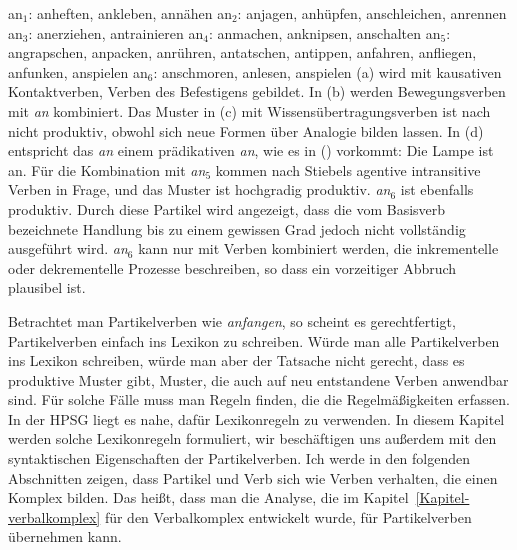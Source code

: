 \eal
\label{verschiedene-ans}
\ex an$_1$: anheften, ankleben, annähen                           
\ex an$_2$: anjagen,  anhüpfen, anschleichen, anrennen            
\ex an$_3$: anerziehen, antrainieren                              
\ex an$_4$: anmachen, anknipsen, anschalten                       
\ex an$_5$: angrapschen, anpacken, anrühren, antatschen, antippen,
            anfahren, anfliegen, anfunken, anspielen              
\ex an$_6$: anschmoren, anlesen, anspielen                        
\zl
(a) wird mit kausativen Kontaktverben, Verben des Befestigens gebildet. In
(b)
werden Bewegungsverben mit \emph{an} kombiniert. Das Muster in (c) mit Wissensübertragungsverben
ist nach \citet[]{Stiebels96a} nicht produktiv, obwohl sich neue Formen über Analogie bilden lassen.
In (d) entspricht das \emph{an} einem prädikativen \emph{an}, wie es in () vorkommt:
\ea
Die Lampe ist an.
\z
Für die Kombination mit \emph{an$_5$} kommen nach Stiebels agentive intransitive Verben in Frage,
und das Muster ist hochgradig produktiv.
\emph{an$_6$} ist ebenfalls produktiv. Durch diese Partikel wird angezeigt, dass die vom Basisverb
bezeichnete Handlung bis zu einem gewissen Grad jedoch nicht vollständig ausgeführt
wird. \emph{an$_6$} kann nur mit Verben kombiniert werden, die inkrementelle oder dekrementelle
Prozesse beschreiben, so dass ein vorzeitiger Abbruch plausibel ist.


Betrachtet man Partikelverben wie \emph{anfangen}, so scheint es gerechtfertigt, Partikelverben einfach
ins Lexikon zu schreiben. Würde man alle Partikelverben ins Lexikon schreiben, würde man aber der Tatsache
nicht gerecht, dass es produktive Muster gibt, \dash Muster, die auch auf neu entstandene Verben anwendbar
sind. Für solche Fälle muss man Regeln finden, die die Regelmäßigkeiten erfassen. In der HPSG liegt
es nahe, dafür Lexikonregeln zu verwenden. In diesem Kapitel werden solche Lexikonregeln formuliert,
wir beschäftigen uns außerdem mit den syntaktischen Eigenschaften der Partikelverben.
Ich werde in den folgenden Abschnitten zeigen, dass Partikel und Verb sich wie Verben verhalten,
die einen Komplex bilden. Das heißt, dass man die Analyse, die im Kapitel~\ref{Kapitel-verbalkomplex}
für den Verbalkomplex entwickelt wurde, für Partikelverben übernehmen kann.

